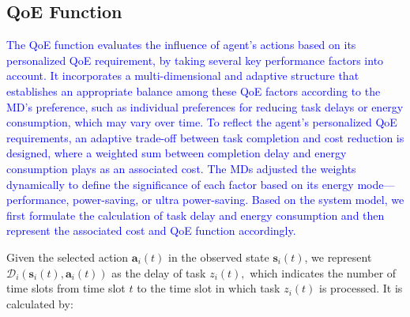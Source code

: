 \documentclass[10pt, journal,letterpaper]{IEEEtran}
\begin{document}
\subsection{QoE Function}

\textcolor{blue}{The QoE function evaluates the influence of agent's actions based on its personalized QoE requirement, by taking several key performance factors into account. It incorporates a multi-dimensional and adaptive structure that establishes an appropriate balance among these QoE factors according to the MD's preference, such as individual preferences for reducing task delays or energy consumption, which may vary over time. To reflect the agent’s personalized QoE requirements, an adaptive trade-off between task completion and cost reduction is designed, where a weighted sum between completion delay and energy consumption plays as an associated cost. The MDs adjusted the weights dynamically to define the significance of each factor based on its energy mode—performance, power-saving, or ultra power-saving. 
Based on the system model, we first formulate the calculation of task delay and energy consumption and then represent the associated cost and QoE function accordingly.}





Given the selected action $\boldsymbol{a}_i(t)$ in the observed state $\boldsymbol{s}_i(t)$, we represent $\mathcal{D}_i(\boldsymbol{s}_i(t), \boldsymbol{a}_i(t))$ as the delay of task $z_i(t),$ which indicates the number of time slots from time slot $t$ to the time slot in which task $z_i(t)$ is processed. It is calculated by: \vspace{2mm}
\end{document}
